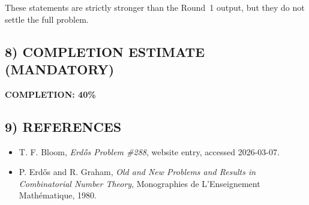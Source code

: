 These statements are strictly stronger than the Round~1 output, but they do not settle the full problem.

\subsection*{8) COMPLETION ESTIMATE (MANDATORY)}
\textbf{COMPLETION: 40\%}

\subsection*{9) REFERENCES}
\begin{itemize}
	\item [Er288] T. F. Bloom, \emph{Erd\H{o}s Problem \#288}, website entry, accessed 2026-03-07.
	\item [ErGr80] P. Erd\H{o}s and R. Graham, \emph{Old and New Problems and Results in Combinatorial Number Theory}, Monographies de L'Enseignement Math\'ematique, 1980.
\end{itemize}


